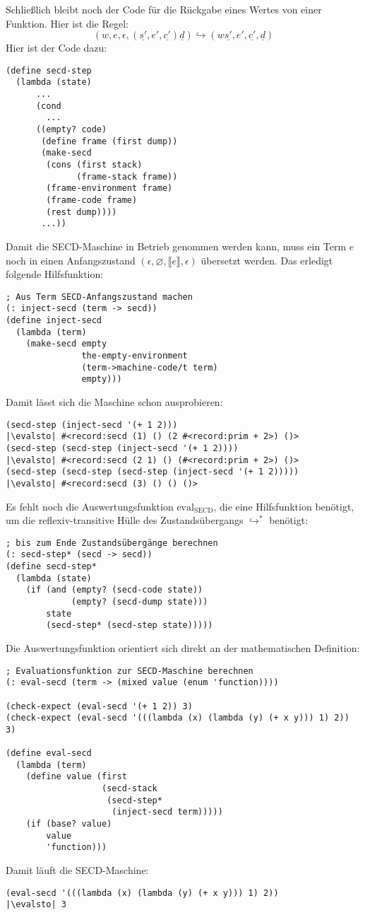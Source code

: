 %
Schließlich bleibt noch der Code für die Rückgabe eines Wertes von
einer Funktion.  Hier ist die Regel:
%
\begin{displaymath}
  (w, e, \epsilon, (\underline{s'}, e', \underline{c'}) \underline{d})
  \hookrightarrow
  (w\underline{s'}, e', \underline{c'}, \underline{d})
\end{displaymath}
%
Hier ist der Code dazu:
%
\begin{lstlisting}
(define secd-step
  (lambda (state)
      ...
      (cond
        ...
      ((empty? code)
       (define frame (first dump))
       (make-secd
        (cons (first stack)
              (frame-stack frame))
        (frame-environment frame)
        (frame-code frame)
        (rest dump))))
       ...))
\end{lstlisting}
%
Damit die SECD-Maschine in Betrieb genommen werden kann, muss ein Term
$e$ noch in einen Anfangszustand $(\epsilon, \varnothing, \llbracket
e\rrbracket, \epsilon)$ übersetzt werden.  Das erledigt folgende
Hilfsfunktion:
%
\begin{lstlisting}
; Aus Term SECD-Anfangszustand machen
(: inject-secd (term -> secd))
(define inject-secd
  (lambda (term)
    (make-secd empty
               the-empty-environment
               (term->machine-code/t term)
               empty)))
\end{lstlisting}
%
Damit lässt sich die Maschine schon ausprobieren:
%
\begin{lstlisting}
(secd-step (inject-secd '(+ 1 2)))
|\evalsto| #<record:secd (1) () (2 #<record:prim + 2>) ()>
(secd-step (secd-step (inject-secd '(+ 1 2))))
|\evalsto| #<record:secd (2 1) () (#<record:prim + 2>) ()>
(secd-step (secd-step (secd-step (inject-secd '(+ 1 2)))))
|\evalsto| #<record:secd (3) () () ()>
\end{lstlisting}
%
Es fehlt noch die Auswertungsfunktion $\mathrm{eval}_\mathrm{SECD}$,
die eine Hilfsfunktion benötigt, um die reflexiv-transitive Hülle des
Zustandsübergangs $\hookrightarrow^*$ benötigt:
%
\begin{lstlisting}
; bis zum Ende Zustandsübergänge berechnen
(: secd-step* (secd -> secd))
(define secd-step*
  (lambda (state)
    (if (and (empty? (secd-code state))
             (empty? (secd-dump state)))
        state
        (secd-step* (secd-step state)))))
\end{lstlisting}
%
Die Auswertungsfunktion orientiert sich direkt an der mathematischen
Definition:
%
\begin{lstlisting}
; Evaluationsfunktion zur SECD-Maschine berechnen
(: eval-secd (term -> (mixed value (enum 'function))))

(check-expect (eval-secd '(+ 1 2)) 3)
(check-expect (eval-secd '(((lambda (x) (lambda (y) (+ x y))) 1) 2)) 3)

(define eval-secd
  (lambda (term)
    (define value (first
                   (secd-stack
                    (secd-step* 
                     (inject-secd term)))))
    (if (base? value)
        value
        'function)))
\end{lstlisting}
%
Damit läuft die SECD-Maschine:
%
\begin{lstlisting}
(eval-secd '(((lambda (x) (lambda (y) (+ x y))) 1) 2))
|\evalsto| 3
\end{lstlisting}

